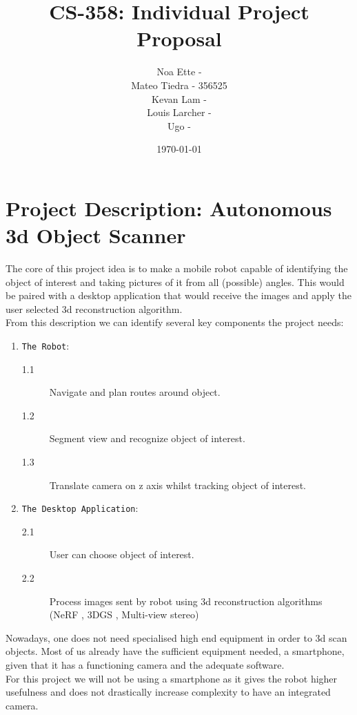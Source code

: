 \documentclass{article}
\title{CS-358: Individual Project Proposal}
\author{Noa Ette - \\Mateo Tiedra - 356525\\Kevan Lam - \\Louis Larcher - \\Ugo -}
\date{\today}
\begin{document}
\maketitle
\vspace{45mm}
\tableofcontents
\newpage
\section{Project Description: Autonomous 3d Object Scanner}

The core of this project idea is to make a mobile robot capable of identifying the object of interest and taking pictures of it from all (possible) angles. 
This would be paired with a desktop application that would receive the images and apply the user selected 3d reconstruction algorithm.\\


From this description we can identify several key components the project needs: \begin{enumerate}
    \item \texttt{The Robot}:
    \begin{description}
            \item[1.1] Navigate and plan routes around object.
            \item[1.2] Segment view and recognize object of interest.
            \item[1.3] Translate camera on z axis whilst tracking object of interest.
    \end{description}
    \item \texttt{The Desktop Application}:
    \begin{description}
        \item[2.1] User can choose object of interest.
        \item[2.2] Process images sent by robot using 3d reconstruction algorithms (NeRF \cite{mildenhall2020nerf}, 3DGS \cite{kerbl3Dgaussians}, Multi-view stereo)
    \end{description}
\end{enumerate}

Nowadays, one does not need specialised high end equipment in order to 3d scan objects. Most of us already have the sufficient equipment needed, a smartphone, given that it has a functioning camera and the adequate software. \\
For this project we will not be using a smartphone as it gives the robot higher usefulness and does not drastically increase complexity to have an integrated camera. 
\end{document}
